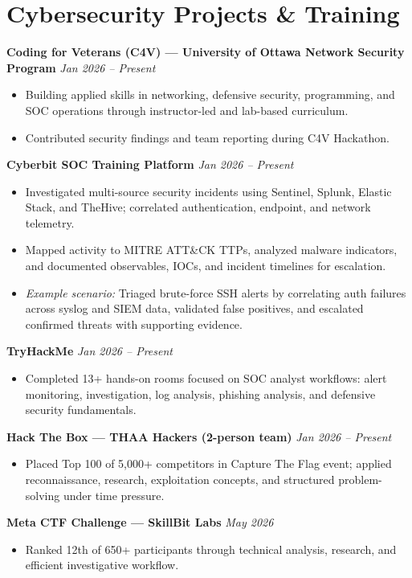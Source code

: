\documentclass[10pt,letterpaper]{article}
\newcommand{\resumeProject}[2]{%
  \textbf{#1} \hfill \textit{#2} \vspace{1pt}
}
\begin{document}
\section{Cybersecurity Projects \& Training}

\resumeProject{Coding for Veterans (C4V) --- University of Ottawa \textbar{} Network Security Program}{Jan 2026 -- Present}
\begin{itemize}
  \item Building applied skills in networking, defensive security, programming, and SOC operations through instructor-led and lab-based curriculum.
  \item Contributed security findings and team reporting during C4V Hackathon.
\end{itemize}

\resumeProject{Cyberbit SOC Training Platform}{Jan 2026 -- Present}
\begin{itemize}
  \item Investigated multi-source security incidents using Sentinel, Splunk, Elastic Stack, and TheHive; correlated authentication, endpoint, and network telemetry.
  \item Mapped activity to MITRE ATT\&CK TTPs, analyzed malware indicators, and documented observables, IOCs, and incident timelines for escalation.
  \item \textit{Example scenario:} Triaged brute-force SSH alerts by correlating auth failures across syslog and SIEM data, validated false positives, and escalated confirmed threats with supporting evidence.
\end{itemize}

\resumeProject{TryHackMe}{Jan 2026 -- Present}
\begin{itemize}
  \item Completed 13+ hands-on rooms focused on SOC analyst workflows: alert monitoring, investigation, log analysis, phishing analysis, and defensive security fundamentals.
\end{itemize}

\resumeProject{Hack The Box --- THAA Hackers (2-person team)}{Jan 2026 -- Present}
\begin{itemize}
  \item Placed Top 100 of 5,000+ competitors in Capture The Flag event; applied reconnaissance, research, exploitation concepts, and structured problem-solving under time pressure.
\end{itemize}

\resumeProject{Meta CTF Challenge --- SkillBit Labs}{May 2026}
\begin{itemize}
  \item Ranked 12th of 650+ participants through technical analysis, research, and efficient investigative workflow.
\end{itemize}
\end{document}
